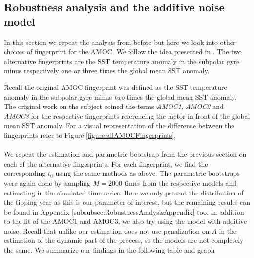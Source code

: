 \subsection{Robustness analysis and the additive noise model}
In this section we repeat the analysis from before but here we look into other choices of fingerprint for the AMOC. We follow the idea presented in \cite{Ditlevsen2023}. The two alternative fingerprints are the SST temperature anomaly in the subpolar gyre minus respectively one or three times the global mean SST anomaly.

Recall the original AMOC fingerprint was defined as the SST temperature anomaly in the subpolar gyre minus \textit{two} times the global mean SST anomaly. The original work on the subject coined the terms \textit{AMOC1}, \textit{AMOC2} and \textit{AMOC3} for the respective fingerprints referencing the factor in front of the global mean SST anomaly. For a visual representation of the difference between the fingerprints refer to Figure \ref{figure:allAMOCFingerprints}.\\\\
We repeat the estimation and parametric bootstrap from the previous section on each of the alternative fingerprints. For each fingerprint, we find the corresponding $t_0$ using the same methods as above. The parametric bootstraps were again done by sampling $M = 2000$ times from the respective models and estimating in the simulated time series. Here we only present the distribution of the tipping year as this is our parameter of interest, but the remaining results can be found in Appendix \ref{subsubsec:RobustnessAnalysisAppendix} too. In addition to the fit of the AMOC1 and AMOC3, we also try using the model with additive noise. Recall that unlike \cite{Ditlevsen2023} our estimation does not use penalization on $A$ in the estimation of the dynamic part of the process, so the models are not completely the same. We summarize our findings in the following table and graph
